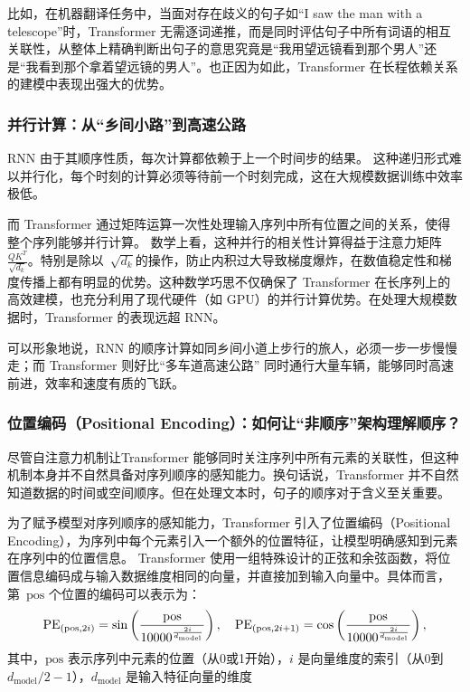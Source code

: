 比如，在机器翻译任务中，当面对存在歧义的句子如“I saw the man with a telescope”时，Transformer 无需逐词递推，而是同时评估句子中所有词语的相互关联性，从整体上精确判断出句子的意思究竟是“我用望远镜看到那个男人”还是“我看到那个拿着望远镜的男人”。也正因为如此，Transformer 在长程依赖关系的建模中表现出强大的优势。

  \subsubsection*{ 并行计算：从“乡间小路”到高速公路 }
RNN 由于其顺序性质，每次计算都依赖于上一个时间步的结果。
这种递归形式难以并行化，每个时刻的计算必须等待前一个时刻完成，这在大规模数据训练中效率极低。

而 Transformer 通过矩阵运算一次性处理输入序列中所有位置之间的关系，使得整个序列能够并行计算。 
数学上看，这种并行的相关性计算得益于注意力矩阵~$\frac{QK^T}{\sqrt{d_k}}​$。特别是除以~$\sqrt{d_k}$​​的操作，防止内积过大导致梯度爆炸，在数值稳定性和梯度传播上都有明显的优势。这种数学巧思不仅确保了 Transformer 在长序列上的高效建模，也充分利用了现代硬件（如 GPU）的并行计算优势。在处理大规模数据时，Transformer 的表现远超 RNN。

可以形象地说，RNN 的顺序计算如同乡间小道上步行的旅人，必须一步一步慢慢走；而 Transformer 则好比“多车道高速公路” 同时通行大量车辆，能够同时高速前进，效率和速度有质的飞跃。

  \subsubsection*{位置编码（Positional Encoding）：如何让“非顺序”架构理解顺序？}
尽管自注意力机制让Transformer 能够同时关注序列中所有元素的关联性，但这种机制本身并不自然具备对序列顺序的感知能力。换句话说，Transformer 并不自然知道数据的时间或空间顺序。但在处理文本时，句子的顺序对于含义至关重要。

为了赋予模型对序列顺序的感知能力，Transformer 引入了位置编码（Positional Encoding），为序列中每个元素引入一个额外的位置特征，让模型明确感知到元素在序列中的位置信息。
Transformer 使用一组特殊设计的正弦和余弦函数，将位置信息编码成与输入数据维度相同的向量，并直接加到输入向量中。具体而言，第~$\text{pos}$ 个位置的编码可以表示为：
$$
\text{PE}_{({\rm pos},2i)} = {\rm sin}\left(  \frac{{\rm pos}}{10000^{\frac{2i}{d_{\rm model}}}}\right), \quad \text{PE}_{({\rm pos},2i+1)} = {\rm cos}\left(  \frac{{\rm pos}}{10000^{\frac{2i}{d_{\rm model}}}}\right), 
$$
其中，$\text{pos}$ 表示序列中元素的位置（从0或1开始），$i$ 是向量维度的索引（从0到$d_{\text{model}}/2-1$），$d_{\text{model}}$ 是输入特征向量的维度


